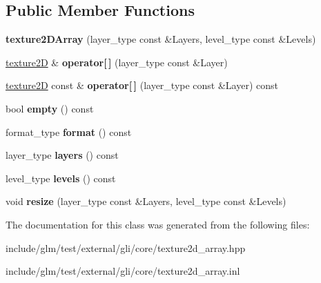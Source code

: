 \subsection*{\-Public \-Member \-Functions}
\begin{DoxyCompactItemize}
\item 
\hypertarget{classgli_1_1texture2DArray_a0c26d709e153858492ad67b3f88b1b43}{{\bfseries texture2\-D\-Array} (layer\-\_\-type const \&\-Layers, level\-\_\-type const \&\-Levels)}\label{classgli_1_1texture2DArray_a0c26d709e153858492ad67b3f88b1b43}

\item 
\hypertarget{classgli_1_1texture2DArray_a0bf4ea99000360882ec48ff42a757ff1}{\hyperlink{classgli_1_1texture2D}{texture2\-D} \& {\bfseries operator\mbox{[}$\,$\mbox{]}} (layer\-\_\-type const \&\-Layer)}\label{classgli_1_1texture2DArray_a0bf4ea99000360882ec48ff42a757ff1}

\item 
\hypertarget{classgli_1_1texture2DArray_a379b027407d94ac7bce400742f6d72ef}{\hyperlink{classgli_1_1texture2D}{texture2\-D} const \& {\bfseries operator\mbox{[}$\,$\mbox{]}} (layer\-\_\-type const \&\-Layer) const }\label{classgli_1_1texture2DArray_a379b027407d94ac7bce400742f6d72ef}

\item 
\hypertarget{classgli_1_1texture2DArray_a34256276caac5d4f321ac86e3b942242}{bool {\bfseries empty} () const }\label{classgli_1_1texture2DArray_a34256276caac5d4f321ac86e3b942242}

\item 
\hypertarget{classgli_1_1texture2DArray_a9bed0d22a5d8983b7f9727fdc34dcf15}{format\-\_\-type {\bfseries format} () const }\label{classgli_1_1texture2DArray_a9bed0d22a5d8983b7f9727fdc34dcf15}

\item 
\hypertarget{classgli_1_1texture2DArray_a6fcf892f404d0350826e3578d8bef069}{layer\-\_\-type {\bfseries layers} () const }\label{classgli_1_1texture2DArray_a6fcf892f404d0350826e3578d8bef069}

\item 
\hypertarget{classgli_1_1texture2DArray_a0b5b79327b7fac7dd0779917a35c4fde}{level\-\_\-type {\bfseries levels} () const }\label{classgli_1_1texture2DArray_a0b5b79327b7fac7dd0779917a35c4fde}

\item 
\hypertarget{classgli_1_1texture2DArray_a047101161a4c44c3e13a7a10d7b94829}{void {\bfseries resize} (layer\-\_\-type const \&\-Layers, level\-\_\-type const \&\-Levels)}\label{classgli_1_1texture2DArray_a047101161a4c44c3e13a7a10d7b94829}

\end{DoxyCompactItemize}


\-The documentation for this class was generated from the following files\-:\begin{DoxyCompactItemize}
\item 
include/glm/test/external/gli/core/texture2d\-\_\-array.\-hpp\item 
include/glm/test/external/gli/core/texture2d\-\_\-array.\-inl\end{DoxyCompactItemize}
